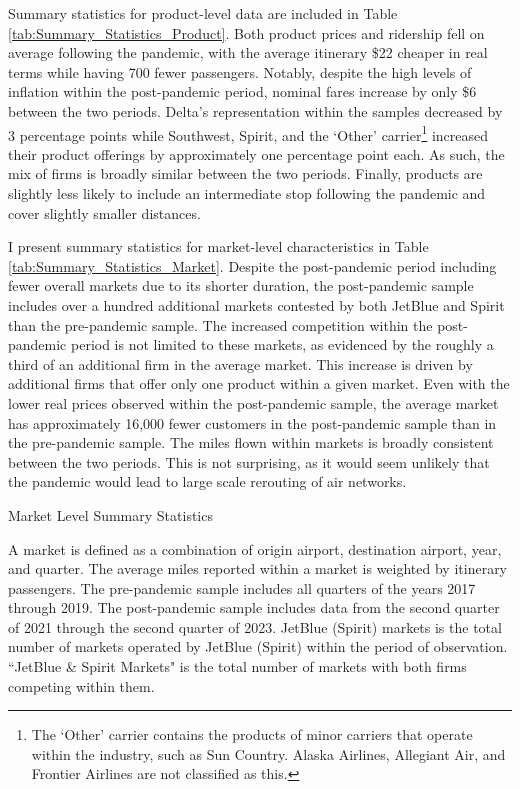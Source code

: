 \documentclass{article}
\begin{document}
    Summary statistics for product-level data are included in Table \ref{tab:Summary_Statistics_Product}. Both product prices and ridership fell on average following the pandemic, with the average itinerary \$22 cheaper in real terms while having 700 fewer passengers. Notably, despite the high levels of inflation within the post-pandemic period, nominal fares increase by only \$6 between the two periods.  Delta's representation within the samples decreased by 3 percentage points while Southwest, Spirit, and the `Other' carrier\footnote{The `Other' carrier contains the products of minor carriers that operate within the industry, such as Sun Country. Alaska Airlines, Allegiant Air, and Frontier Airlines are not classified as this.} increased their product offerings by approximately one percentage point each. As such, the mix of firms is broadly similar between the two periods. Finally, products are slightly less likely to include an intermediate stop following the pandemic and cover slightly smaller distances. 

    I present summary statistics for market-level characteristics in Table \ref{tab:Summary_Statistics_Market}. Despite the post-pandemic period including fewer overall markets due to its shorter duration, the post-pandemic sample includes over a hundred additional markets contested by both JetBlue and Spirit than the pre-pandemic sample. The increased competition within the post-pandemic period is not limited to these markets, as evidenced by the roughly a third of an additional firm in the average market. This increase is driven by additional firms that offer only one product within a given market. Even with the lower real prices observed within the post-pandemic sample, the average market has approximately 16,000 fewer customers in the post-pandemic sample than in the pre-pandemic sample. The miles flown within markets is broadly consistent between the two periods. This is not surprising, as it would seem unlikely that the pandemic would lead to large scale rerouting of air networks. 

    \begin{table}
        \caption{Market Level Summary Statistics}
        \label{tab:Summary_Statistics_Market}
                \vspace{-15mm}
\begin{center}
            
            \end{center}
    \vspace{-5mm}
            \footnotesize{A market is defined as a combination of origin airport, destination airport, year, and quarter. The average miles reported within a market is weighted by itinerary passengers. The pre-pandemic sample includes all quarters of the years 2017 through 2019. The post-pandemic sample includes data from the second quarter of 2021 through the second quarter of 2023. JetBlue (Spirit) markets is the total number of markets operated by JetBlue (Spirit) within the period of observation. ``JetBlue \& Spirit Markets" is the total number of markets with both firms competing within them.}

    \end{table}
\end{document}

